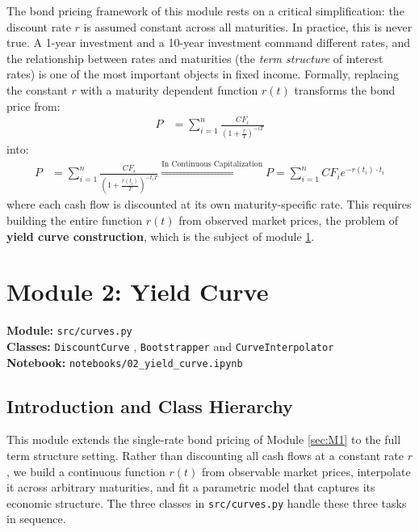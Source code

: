\documentclass{article}
\theoremstyle{definition}  %
\theoremstyle{plain}  %
\numberwithin{definition}{section}
\numberwithin{proposition}{section}
\numberwithin{theorem}{section}
\numberwithin{equation}{section}
\begin{document}
The bond pricing framework of this module rests on a critical simplification: the discount rate $r$ is assumed constant across all maturities. In practice, this is never true. A 1-year investment and a 10-year investment command different rates, and the relationship between rates and maturities (the \textit{term structure} of interest rates) is one of the most important objects in fixed income. Formally, replacing the constant $r$ with a maturity dependent function $r(t)$ transforms the bond price from:
\begin{align*}
    P &= \sum_{i = 1}^{n} \frac{CF_{i}}{(1 + \frac{r}{T})^{-iT}}
\end{align*}
into:
\begin{align*}
    P &= \sum_{i = 1}^{n} \frac{CF_{i}}{(1 + \frac{r(t_{i})}{T})^{-t_{i}T}} \overset{\text{In Continuous Capitalization}}{\Rightarrow} P = \sum_{i = 1}^{n} CF_{i} e^{-r(t_{i}) \cdot t_{i}}
\end{align*}
where each cash flow is discounted at its own maturity-specific rate. This requires building the entire function $r(t)$ from observed market prices, the problem of \textbf{yield curve construction}, which is the subject of module \ref{sec:M2}.

\newpage

\section{Module 2: Yield Curve}
\label{sec:M2}

\begin{tcolorbox}[title = Python Implementation, colback = pythonyellow!80!white, colframe = pythonblue]
    \textbf{Module:} \color{magenta} \texttt{src/curves.py} \color{black} \\
    \textbf{Classes:} \color{codegreen} \texttt{DiscountCurve} \color{black}, \color{codegreen} \texttt{Bootstrapper} \color{black} and \color{codegreen} \texttt{CurveInterpolator} \color{black} \\
    \textbf{Notebook:} \texttt{notebooks/02\_yield\_curve.ipynb}
\end{tcolorbox}

\subsection{Introduction and Class Hierarchy}

This module extends the single-rate bond pricing of Module \ref{sec:M1} to the full term structure setting. Rather than discounting all cash flows at a constant rate $r$, we build a continuous function $r(t)$ from observable market prices, interpolate it across arbitrary maturities, and fit a parametric model that captures its economic structure. The three classes in \color{magenta} \texttt{src/curves.py} \color{black} handle these three tasks in sequence.
\end{document}
